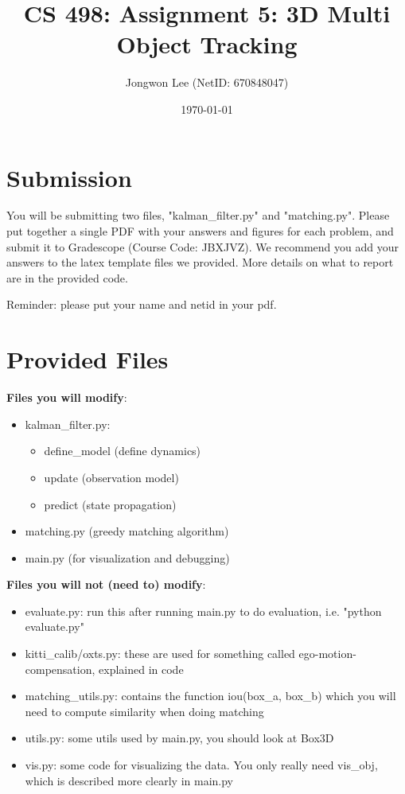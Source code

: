 \documentclass[11pt]{article}
\begin{document}
\author{Jongwon Lee (NetID: 670848047)}
\title{CS 498: Assignment 5: 3D Multi Object Tracking}
\date{\today}
\maketitle

\medskip


\section*{Submission}

You will be submitting two files, "kalman\_filter.py" and "matching.py". Please put together a single PDF with your answers and figures for each problem, and submit it to Gradescope (Course Code: JBXJVZ). 
We recommend you add your answers to the latex template files we provided. More details on what to report are in the provided code. 

Reminder: please put your name and netid in your pdf.

\section*{Provided Files}

\textbf{Files you will modify}:
\begin{itemize}
    \item kalman\_filter.py: 
    \begin{itemize}
        \item define\_model (define dynamics)
        \item update (observation model)
        \item predict (state propagation)
    \end{itemize}
    \item matching.py (greedy matching algorithm)
    \item main.py (for visualization and debugging)
\end{itemize}

\noindent \textbf{Files you will not (need to) modify}:
\begin{itemize}
    \item evaluate.py: run this after running main.py to do evaluation, i.e. "python evaluate.py"
    \item kitti\_calib/oxts.py: these are used for something called ego-motion-compensation, explained in code
    \item matching\_utils.py: contains the function iou(box\_a, box\_b) which you will need to compute similarity when doing matching
    \item utils.py: some utils used by main.py, you should look at Box3D
    \item vis.py: some code for visualizing the data. You only really need vis\_obj, which is described more clearly in main.py
\end{itemize}
\end{document}
